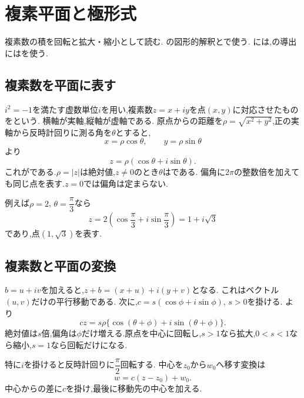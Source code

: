 
\section{複素平面と極形式}\label{節：極形式と複素平面}
  複素数の積を回転と拡大・縮小として読む.
  の図形的解釈とで使う.
  には,の導出にはを使う.

  \subsection{複素数を平面に表す}\label{節：複素平面と極形式}
    $i^2=-1$を満たす虚数単位$i$を用い,複素数$z=x+iy$を点$(x,y)$に対応させたものをという.
    横軸が実軸,縦軸が虚軸である.
    原点からの距離を$\rho=\sqrt{x^2+y^2}$,正の実軸から反時計回りに測る角を$\theta$とすると,
    \[
      x=\rho\cos\theta,\qquad y=\rho\sin\theta
    \]
    より
    \[
      z=\rho(\cos\theta+i\sin\theta).
    \]
    これがである.$\rho=|z|$は絶対値,$z\ne0$のとき$\theta$はである.
    偏角に$2\pi$の整数倍を加えても同じ点を表す.$z=0$では偏角は定まらない.
    \BookFigPolar

    例えば$\rho=2$, $\theta=\dfrac{\pi}{3}$なら
    \[
      z=2\left(\cos\frac\pi3+i\sin\frac\pi3\right)=1+i\sqrt3
    \]
    であり,点$(1,\sqrt3)$を表す.

  \subsection{複素数と平面の変換}\label{節：複素数による平面上の変換}
    $b=u+iv$を加えると,$z+b=(x+u)+i(y+v)$となる.
    これはベクトル$(u,v)$だけの平行移動である.
    次に,$c=s(\cos\phi+i\sin\phi)$, $s>0$を掛ける.
    より
    \[
      cz=s\rho\{\cos(\theta+\phi)+i\sin(\theta+\phi)\}.
    \]
    絶対値は$s$倍,偏角は$\phi$だけ増える.原点を中心に回転し,$s>1$なら拡大,$0<s<1$なら縮小,$s=1$なら回転だけになる.
    \BookFigComplexRotation

    特に$i$を掛けると反時計回りに$\dfrac{\pi}{2}$回転する.
    中心を$z_0$から$w_0$へ移す変換は
    \[
      w=c(z-z_0)+w_0.
    \]
    中心からの差に$c$を掛け,最後に移動先の中心を加える.


